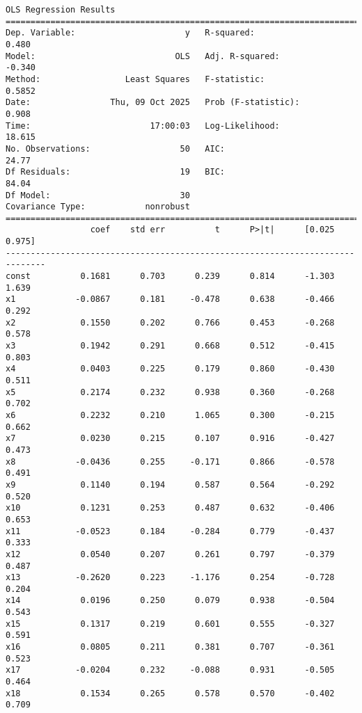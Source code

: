 \documentclass[11pt]{article}
\begin{document}
    \begin{Verbatim}[commandchars=\\\{\}]
                            OLS Regression Results
==============================================================================
Dep. Variable:                      y   R-squared:                       0.480
Model:                            OLS   Adj. R-squared:                 -0.340
Method:                 Least Squares   F-statistic:                    0.5852
Date:                Thu, 09 Oct 2025   Prob (F-statistic):              0.908
Time:                        17:00:03   Log-Likelihood:                 18.615
No. Observations:                  50   AIC:                             24.77
Df Residuals:                      19   BIC:                             84.04
Df Model:                          30
Covariance Type:            nonrobust
==============================================================================
                 coef    std err          t      P>|t|      [0.025      0.975]
------------------------------------------------------------------------------
const          0.1681      0.703      0.239      0.814      -1.303       1.639
x1            -0.0867      0.181     -0.478      0.638      -0.466       0.292
x2             0.1550      0.202      0.766      0.453      -0.268       0.578
x3             0.1942      0.291      0.668      0.512      -0.415       0.803
x4             0.0403      0.225      0.179      0.860      -0.430       0.511
x5             0.2174      0.232      0.938      0.360      -0.268       0.702
x6             0.2232      0.210      1.065      0.300      -0.215       0.662
x7             0.0230      0.215      0.107      0.916      -0.427       0.473
x8            -0.0436      0.255     -0.171      0.866      -0.578       0.491
x9             0.1140      0.194      0.587      0.564      -0.292       0.520
x10            0.1231      0.253      0.487      0.632      -0.406       0.653
x11           -0.0523      0.184     -0.284      0.779      -0.437       0.333
x12            0.0540      0.207      0.261      0.797      -0.379       0.487
x13           -0.2620      0.223     -1.176      0.254      -0.728       0.204
x14            0.0196      0.250      0.079      0.938      -0.504       0.543
x15            0.1317      0.219      0.601      0.555      -0.327       0.591
x16            0.0805      0.211      0.381      0.707      -0.361       0.523
x17           -0.0204      0.232     -0.088      0.931      -0.505       0.464
x18            0.1534      0.265      0.578      0.570      -0.402       0.709

\end{Verbatim}
\end{document}
